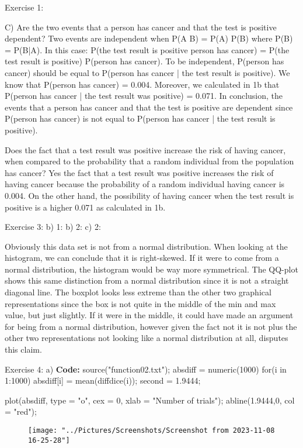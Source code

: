 
Exercise 1:

C) 
Are the two events that a person has cancer and that the test is positive dependent? 
Two events are independent when P(A \cap B) = P(A) \cdot P(B) where P(B) = P(B|A). In this case: P(the test result is positive \cap person has cancer) = P(the test result is positive) \cdot  P(person has cancer).
To be independent, P(person has cancer) should be equal to P(person has cancer | the test result is positive). We know that P(person has cancer) = 0.004. 
Moreover, we calculated in 1b that P(person has cancer | the test result was positive) = 0.071. In conclusion, the events that a person has cancer and that the test is positive are dependent since P(person has cancer) is
not equal to P(person has cancer | the test result is positive). 

Does the fact that a test result was positive increase the risk of having cancer, when compared to the probability that a random
individual from the population has cancer?
Yes the fact that a test result was positive increases the risk of having cancer because the probability of a random individual having cancer is 0.004.
On the other hand, the possibility of having cancer when the test result is positive is a higher 0.071 as calculated in 1b. 


Exercise 3:
b) 1:
b) 2:
c) 2: 

Obviously this data set is not from a normal distribution. When looking at the histogram, we can conclude that it is right-skewed. If it were to come from a normal distribution, the histogram would be way 
more symmetrical. The QQ-plot shows this same distinction from a normal distribution since it is not a straight diagonal line. The boxplot looks less extreme than the other two graphical representations since the box is not quite in the middle of the min and max value, but just slightly. If it were in the middle, it could have made an argument for being from a normal distribution, however given the fact not it is not plus the other two representations not looking like a normal distribution at all, disputes this claim. 

Exercise 4:
a) 
\textbf{Code:}
source("function02.txt");
absdiff = numeric(1000)
for(i in 1:1000){
	absdiff[i] = mean(diffdice(i));
}
second = 1.9444;

plot(absdiff, type = "o", cex = 0, xlab = "Number of trials");
abline(1.9444,0, col = "red");
\begin{figure}
	\centering
	\texttt{[image: "../Pictures/Screenshots/Screenshot from 2023-11-08 16-25-28"]}
	\caption{}
	\label{fig:screenshot-from-2023-11-08-16-25-28}
\end{figure}





